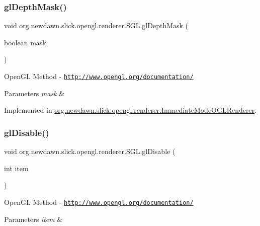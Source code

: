 \subsubsection{\texorpdfstring{gl\+Depth\+Mask()}{glDepthMask()}}
{\footnotesize\ttfamily void org.\+newdawn.\+slick.\+opengl.\+renderer.\+S\+G\+L.\+gl\+Depth\+Mask (\begin{DoxyParamCaption}\item[{boolean}]{mask }\end{DoxyParamCaption})}

Open\+GL Method -\/  \href{http://www.opengl.org/documentation/}{\tt http\+://www.\+opengl.\+org/documentation/}


\begin{DoxyParams}{Parameters}
{\em mask} & \\
\hline
\end{DoxyParams}


Implemented in \mbox{\hyperlink{classorg_1_1newdawn_1_1slick_1_1opengl_1_1renderer_1_1_immediate_mode_o_g_l_renderer_abb07babee3701b419044d3e74d16c700}{org.\+newdawn.\+slick.\+opengl.\+renderer.\+Immediate\+Mode\+O\+G\+L\+Renderer}}.

\mbox{\label{interfaceorg_1_1newdawn_1_1slick_1_1opengl_1_1renderer_1_1_s_g_l_a3b47b402f84bc1404e6b218264981bb5}} 
\subsubsection{\texorpdfstring{gl\+Disable()}{glDisable()}}
{\footnotesize\ttfamily void org.\+newdawn.\+slick.\+opengl.\+renderer.\+S\+G\+L.\+gl\+Disable (\begin{DoxyParamCaption}\item[{int}]{item }\end{DoxyParamCaption})}

Open\+GL Method -\/  \href{http://www.opengl.org/documentation/}{\tt http\+://www.\+opengl.\+org/documentation/}


\begin{DoxyParams}{Parameters}
{\em item} & \\
\hline
\end{DoxyParams}


